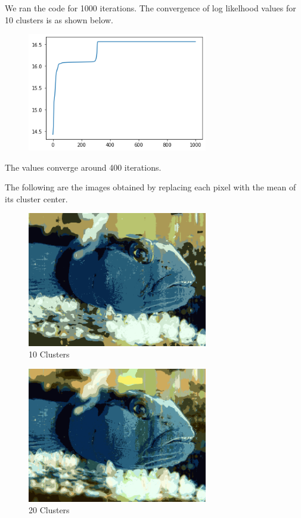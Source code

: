 \documentclass{article}      %
\begin{document}
We ran the code for 1000 iterations. The convergence of log likelhood values for 10 clusters is as shown below. 

\begin{figure}[H]
\centering
\includegraphics[width=0.7\textwidth]{Convergence_parta_10}
\end{figure}

The values converge around 400 iterations.

The following are the images obtained by replacing each pixel with the mean of its cluster center.     

   
\begin{figure}[H]
\centering
\includegraphics[width=0.7\textwidth]{parta_10_means}
\caption{10 Clusters}
\end{figure}

   
\begin{figure}[H]
\centering
\includegraphics[width=0.7\textwidth]{parta_20_means}
\caption{20 Clusters}
\end{figure}
\end{document}
